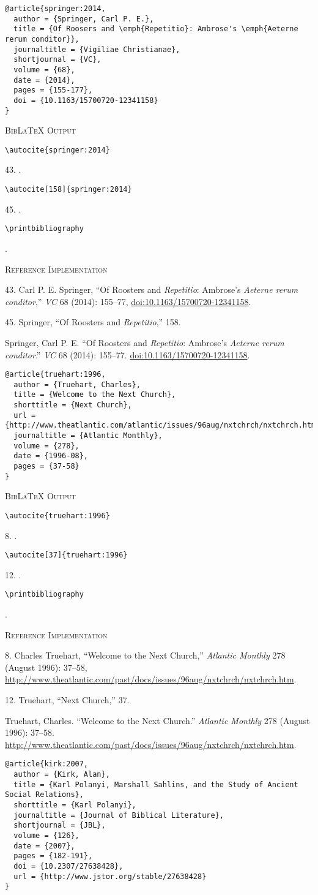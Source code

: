 \documentclass[a4paper]{article}
\newcommand\citetestnpf[4]{%
  {\textsc{BibLaTeX Output}\par
   \nobreak
   \texttt{\textbackslash autocite\{#4\}}\par
   \color{biblatex-colour}
   #1. \cite{#4}.\par
   \color{black}
   \texttt{\textbackslash autocite[#3]\{#4\}}\par
   \color{biblatex-colour}
   #2. \cite[#3]{#4}.\par
   \color{black}
   \texttt{\textbackslash printbibliography}\par
   \color{biblatex-colour}
   \hangindent\bibindent\bibentrycite{#4}.\par}}
\newenvironment{refimp}{%
  \begin{minipage}{\linewidth}
    \setlength{\parskip}{1ex}
    \textsc{Reference Implementation}\par
    \nobreak
    \color{reference-colour}
}{\end{minipage}}
\begin{document}
\begin{lstlisting}
@article{springer:2014,
  author = {Springer, Carl P. E.},
  title = {Of Roosers and \emph{Repetitio}: Ambrose's \emph{Aeterne rerum conditor}},
  journaltitle = {Vigiliae Christianae},
  shortjournal = {VC},
  volume = {68},
  date = {2014},
  pages = {155-177},
  doi = {10.1163/15700720-12341158}
}
\end{lstlisting}

\citetestnpf{43}{45}{158}{springer:2014}

\begin{refimp}
  43. Carl P. E. Springer, “Of Roosters and \emph{Repetitio}: Ambrose’s
  \emph{Aeterne rerum conditor},” \emph{VC} 68 (2014): 155–77,
  \url{doi:10.1163/15700720-12341158}.

  45. Springer, “Of Roosters and \emph{Repetitio},” 158.

  \hangindent\bibindent Springer, Carl P. E. “Of Roosters and
  \emph{Repetitio}: Ambrose’s \emph{Aeterne rerum conditor}.” \emph{VC} 68
  (2014): 155–77. \url{doi:10.1163/15700720-12341158}.
\end{refimp}

\begin{lstlisting}
@article{truehart:1996,
  author = {Truehart, Charles},
  title = {Welcome to the Next Church},
  shorttitle = {Next Church},
  url = {http://www.theatlantic.com/atlantic/issues/96aug/nxtchrch/nxtchrch.htm},
  journaltitle = {Atlantic Monthly},
  volume = {278},
  date = {1996-08},
  pages = {37-58}
}
\end{lstlisting}

\citetestnpf{8}{12}{37}{truehart:1996}

\begin{refimp}
  8. Charles Truehart, “Welcome to the Next Church,” \emph{Atlantic Monthly}
  278 (August 1996): 37–58,
  \url{http://www.theatlantic.com/past/docs/issues/96aug/nxtchrch/nxtchrch.htm}.

  12. Truehart, “Next Church,” 37.
 
  \hangindent\bibindent Truehart, Charles. “Welcome to the Next Church.”
  \emph{Atlantic Monthly} 278 (August
  1996): 37–58.
  \url{http://www.theatlantic.com/past/docs/issues/96aug/nxtchrch/nxtchrch.htm}.
\end{refimp}

\begin{lstlisting}
@article{kirk:2007,
  author = {Kirk, Alan},
  title = {Karl Polanyi, Marshall Sahlins, and the Study of Ancient Social Relations},
  shorttitle = {Karl Polanyi},
  journaltitle = {Journal of Biblical Literature},
  shortjournal = {JBL},
  volume = {126},
  date = {2007},
  pages = {182-191},
  doi = {10.2307/27638428},
  url = {http://www.jstor.org/stable/27638428}
}
\end{lstlisting}
\end{document}
